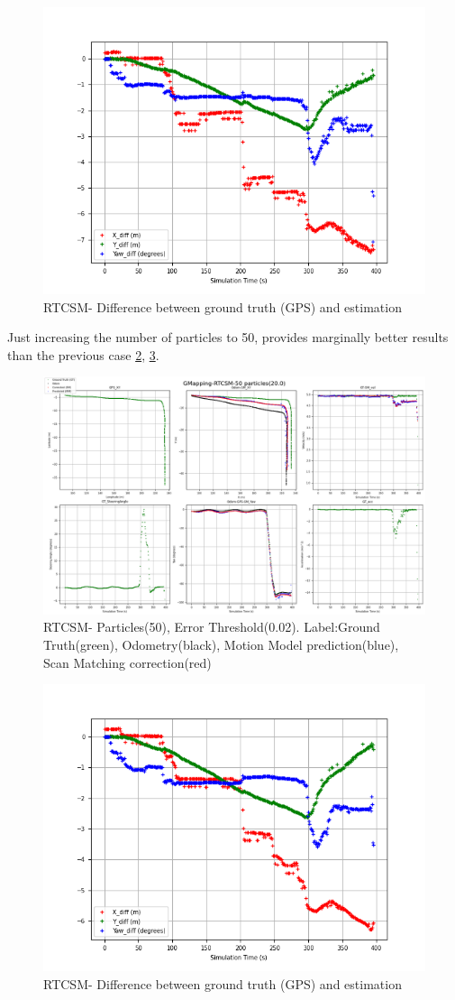     \begin{figure}[h] 
        \includegraphics[height=0.4\textwidth]{images/GMapping-RTCSM-20 particles(20.0)_True_vs_Crct.png}
        \caption{RTCSM- Difference between ground truth (GPS) and estimation}
        \label{fig:RTCSM_20_0.05_diff}
    \end{figure}
\clearpage
Just increasing the number of particles to 50, provides marginally better results than the previous case \ref{fig:RTCSM_50_0.05}, \ref{fig:RTCSM_50_0.05_diff}.
    \begin{figure}[h] 
        \includegraphics[height=0.6\textwidth]{images/GMapping-RTCSM-50 particles(20.0)_PositionParameters.png}
        \caption{RTCSM- Particles(50), Error Threshold(0.02). Label:Ground Truth(green), Odometry(black), Motion Model prediction(blue), Scan Matching correction(red)}
        \label{fig:RTCSM_50_0.05}
    \end{figure}
    \begin{figure}[h] 
        \includegraphics[height=0.4\textwidth]{images/GMapping-RTCSM-50 particles(20.0)_True_vs_Crct.png}
        \caption{RTCSM- Difference between ground truth (GPS) and estimation}
        \label{fig:RTCSM_50_0.05_diff}
    \end{figure}
